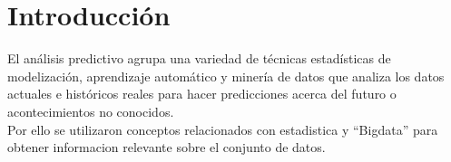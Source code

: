 \section{Introducción}
	El análisis predictivo agrupa una variedad de técnicas estadísticas de modelización, aprendizaje automático y minería de datos que analiza los datos  actuales e históricos reales para hacer predicciones acerca del futuro o  acontecimientos no conocidos.\\
	Por ello se utilizaron conceptos relacionados con estadistica y ``Bigdata'' para obtener informacion relevante sobre el conjunto de datos.
